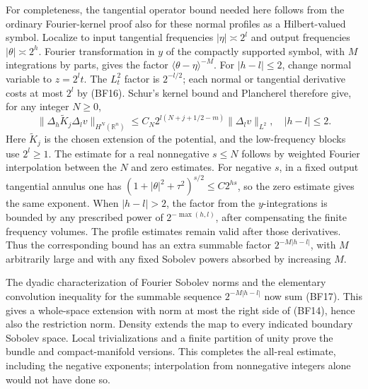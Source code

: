 \documentclass[
  11pt,
]{article}
\makeatletter
\let\ReaderOriginalAnchorStart\hyper@anchorstart
\let\ReaderOriginalAnchorEnd\hyper@anchorend
\let\ReaderPendingAliases\@empty
\def\ReaderArmAliases#1{\gdef\ReaderPendingAliases{#1}}
\def\hyper@anchorstart#1{\ReaderIfNativeAnchorTF{#1}{\ReaderPendingAliases\global\let\ReaderPendingAliases\@empty}{}\ReaderOriginalAnchorStart{#1}}
\makeatother
\begin{document}
For completeness, the tangential operator bound needed here follows from
the ordinary Fourier-kernel proof also for these normal profiles as a
Hilbert-valued symbol. Localize to input tangential frequencies
\(|\eta|\asymp2^l\) and output frequencies \(|\theta|\asymp2^h\).
Fourier transformation in \(y\) of the compactly supported symbol, with
\(M\) integrations by parts, gives the factor
\(\langle\theta-\eta\rangle^{-M}\). For \(|h-l|\leq2\), change normal
variable to \(z=2^lt\). The \(L^2_t\) factor is \(2^{-l/2}\); each
normal or tangential derivative costs at most \(2^l\) by (BF16). Schur's
kernel bound and Plancherel therefore give, for any integer \(N\geq0\),
\[
 \|\Delta_h\widetilde K_j\Delta_l v\|_{H^N(\mathbb R^n)}
 \leq C_N 2^{l(N+j+1/2-m)}\|\Delta_l v\|_{L^2},
 \quad |h-l|\leq2.
 \tag{BF17}
\] Here \(\widetilde K_j\) is the chosen extension of the potential, and
the low-frequency blocks use \(2^l\geq1\). The estimate for a real
nonnegative \(s\leq N\) follows by weighted Fourier interpolation
between the \(N\) and zero estimates. For negative \(s\), in a fixed
output tangential annulus one has
\((1+|\theta|^2+\tau^2)^{s/2}\leq C2^{hs}\), so the zero estimate gives
the same exponent. When \(|h-l|>2\), the factor from the
\(y\)-integrations is bounded by any prescribed power of
\(2^{-\max(h,l)}\), after compensating the finite frequency volumes. The
profile estimates remain valid after those derivatives. Thus the
corresponding bound has an extra summable factor \(2^{-M|h-l|}\), with
\(M\) arbitrarily large and with any fixed Sobolev powers absorbed by
increasing \(M\).

The dyadic characterization of Fourier Sobolev norms and the elementary
convolution inequality for the summable sequence \(2^{-M|h-l|}\) now sum
(BF17). This gives a whole-space extension with norm at most the right
side of (BF14), hence also the restriction norm. Density extends the map
to every indicated boundary Sobolev space. Local trivializations and a
finite partition of unity prove the bundle and compact-manifold
versions. This completes the all-real estimate, including the negative
exponents; interpolation from nonnegative integers alone would not have
done so.

\ReaderArmAliases{\ReaderOriginalAnchorStart{AN03-GFB-006}\ReaderOriginalAnchorEnd\begingroup\expandafter\def\csname @currentHref\endcsname{AN03-GFB-006}\label{AN03-GFB-006}\endgroup\ReaderOriginalAnchorStart{an03-gfb-006-interior-forcing-through-a-general-transmission-operator}\ReaderOriginalAnchorEnd\begingroup\expandafter\def\csname @currentHref\endcsname{an03-gfb-006-interior-forcing-through-a-general-transmission-operator}\label{an03-gfb-006-interior-forcing-through-a-general-transmission-operator}\endgroup\ReaderOriginalAnchorStart{6-interior-forcing-through-a-general-transmission-operator}\ReaderOriginalAnchorEnd\begingroup\expandafter\def\csname @currentHref\endcsname{6-interior-forcing-through-a-general-transmission-operator}\label{6-interior-forcing-through-a-general-transmission-operator}\endgroup\ReaderOriginalAnchorStart{interior-forcing-through-a-general-transmission-operator}\ReaderOriginalAnchorEnd}
\end{document}
